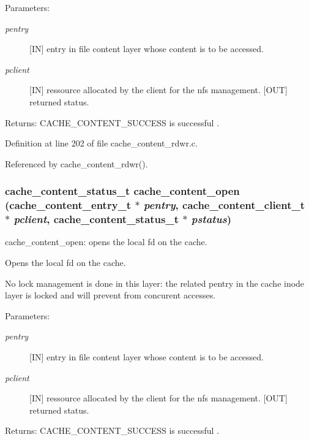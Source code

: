 \begin{Desc}
\item[Parameters:]
\begin{description}
\item[{\em pentry}][IN] entry in file content layer whose content is to be accessed. \item[{\em pclient}][IN] ressource allocated by the client for the nfs management.  [OUT] returned status.\end{description}
\end{Desc}
\begin{Desc}
\item[Returns:]CACHE\_\-CONTENT\_\-SUCCESS is successful . \end{Desc}


Definition at line 202 of file cache\_\-content\_\-rdwr.c.

Referenced by cache\_\-content\_\-rdwr().
\subsubsection{\setlength{\rightskip}{0pt plus 5cm}cache\_\-content\_\-status\_\-t cache\_\-content\_\-open (cache\_\-content\_\-entry\_\-t $\ast$ {\em pentry}, cache\_\-content\_\-client\_\-t $\ast$ {\em pclient}, cache\_\-content\_\-status\_\-t $\ast$ {\em pstatus})}\label{cache__content__rdwr_8c_a2}


cache\_\-content\_\-open: opens the local fd on the cache.

Opens the local fd on the cache.

No lock management is done in this layer: the related pentry in the cache inode layer is locked and will prevent from concurent accesses.

\begin{Desc}
\item[Parameters:]
\begin{description}
\item[{\em pentry}][IN] entry in file content layer whose content is to be accessed. \item[{\em pclient}][IN] ressource allocated by the client for the nfs management.  [OUT] returned status.\end{description}
\end{Desc}
\begin{Desc}
\item[Returns:]CACHE\_\-CONTENT\_\-SUCCESS is successful . \end{Desc}


